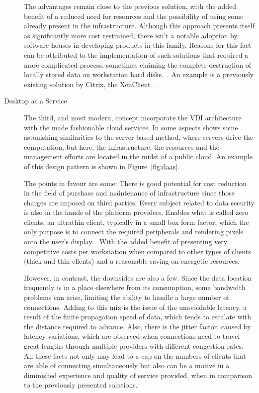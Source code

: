 \begin{description}
		The advantages remain close to the previous solution, with the added benefit of a reduced need for resources and the possibility of using some already present in the infrastructure. Although this approach presents itself as significantly more cost restrained, there isn't a notable adoption by software houses in developing products in this family. Reasons for this fact can be attributed to the implementation of such solutions that required a more complicated process, sometimes claiming the complete destruction of locally stored data on workstation hard disks.~\cite{VMblog_Citrix}. An example is a previously existing solution by Citrix, the XenClient~\cite{Citrix_XenDesktop}.
	\item [Desktop as a Service] The third, and most modern, concept incorporate the VDI architecture with the made fashionable cloud services. In some aspects shows some astonishing similarities to the server-based method, where servers drive the computation, but here, the infrastructure, the resources and the management efforts are located in the midst of a public cloud. An example of this design pattern is shown in Figure~\ref{fig:daas}.

		The points in favour are some: There is good potential for cost reduction in the field of purchase and maintenance of infrastructure since those charges are imposed on third parties. Every subject related to data security is also in the hands of the platform providers. Enables what is called zero clients, an ultrathin client, typically in a small box form factor, which the only purpose is to connect the required peripherals and rendering pixels onto the user’s display.~\cite{VMWare_Zikmund2014} With the added benefit of presenting very competitive costs per workstation when compared to other types of clients (thick and thin clients) and a reasonable saving on energetic resources.

		However, in contrast, the downsides are also a few. Since the data location frequently is in a place elsewhere from its consumption, some bandwidth problems can arise, limiting the ability to handle a large number of connections. Adding to this mix is the issue of the unavoidable latency, a result of the finite propagation speed of data, which tends to escalate with the distance required to advance. Also, there is the jitter factor, caused by latency variations, which are observed when connections need to travel great lengths through multiple providers with different congestion rates. All these facts not only may lead to a cap on the numbers of clients that are able of connecting simultaneously but also can be a motive in a diminished experience and quality of service provided, when in comparison to the previously presented solutions.
		

\end{description}
